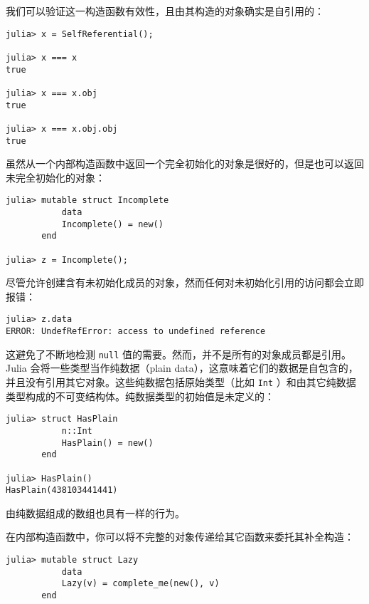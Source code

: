 我们可以验证这一构造函数有效性，且由其构造的对象确实是自引用的：




\begin{verbatim}
julia> x = SelfReferential();

julia> x === x
true

julia> x === x.obj
true

julia> x === x.obj.obj
true
\end{verbatim}



虽然从一个内部构造函数中返回一个完全初始化的对象是很好的，但是也可以返回未完全初始化的对象：




\begin{verbatim}
julia> mutable struct Incomplete
           data
           Incomplete() = new()
       end

julia> z = Incomplete();
\end{verbatim}



尽管允许创建含有未初始化成员的对象，然而任何对未初始化引用的访问都会立即报错：




\begin{verbatim}
julia> z.data
ERROR: UndefRefError: access to undefined reference
\end{verbatim}



这避免了不断地检测 \texttt{null} 值的需要。然而，并不是所有的对象成员都是引用。Julia 会将一些类型当作纯数据（{\textquotedbl}plain data{\textquotedbl}），这意味着它们的数据是自包含的，并且没有引用其它对象。这些纯数据包括原始类型（比如 \texttt{Int} ）和由其它纯数据类型构成的不可变结构体。纯数据类型的初始值是未定义的：




\begin{verbatim}
julia> struct HasPlain
           n::Int
           HasPlain() = new()
       end

julia> HasPlain()
HasPlain(438103441441)
\end{verbatim}



由纯数据组成的数组也具有一样的行为。



在内部构造函数中，你可以将不完整的对象传递给其它函数来委托其补全构造：




\begin{verbatim}
julia> mutable struct Lazy
           data
           Lazy(v) = complete_me(new(), v)
       end
\end{verbatim}



